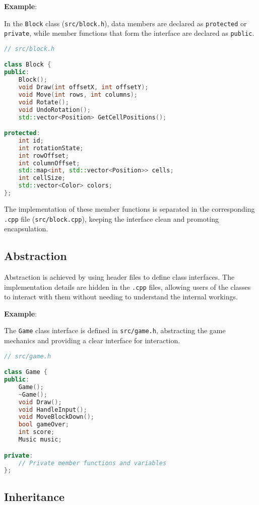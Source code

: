 \documentclass{article}
\begin{document}
\textbf{Example}:

In the \texttt{Block} class (\texttt{src/block.h}), data members are declared as \texttt{protected} or \texttt{private}, while member functions that form the interface are declared as \texttt{public}.

\begin{lstlisting}[language=C++]
// src/block.h

class Block {
public:
    Block();
    void Draw(int offsetX, int offsetY);
    void Move(int rows, int columns);
    void Rotate();
    void UndoRotation();
    std::vector<Position> GetCellPositions();

protected:
    int id;
    int rotationState;
    int rowOffset;
    int columnOffset;
    std::map<int, std::vector<Position>> cells;
    int cellSize;
    std::vector<Color> colors;
};
\end{lstlisting}

The implementation of these member functions is separated in the corresponding \texttt{.cpp} file (\texttt{src/block.cpp}), keeping the interface clean and promoting encapsulation.

\subsection{Abstraction}

Abstraction is achieved by using header files to define class interfaces. The implementation details are hidden in the \texttt{.cpp} files, allowing users of the classes to interact with them without needing to understand the internal workings.

\textbf{Example}:

The \texttt{Game} class interface is defined in \texttt{src/game.h}, abstracting the game mechanics and providing a clear interface for interaction.

\begin{lstlisting}[language=C++]
// src/game.h

class Game {
public:
    Game();
    ~Game();
    void Draw();
    void HandleInput();
    void MoveBlockDown();
    bool gameOver;
    int score;
    Music music;

private:
    // Private member functions and variables
};
\end{lstlisting}

\subsection{Inheritance}
\end{document}
